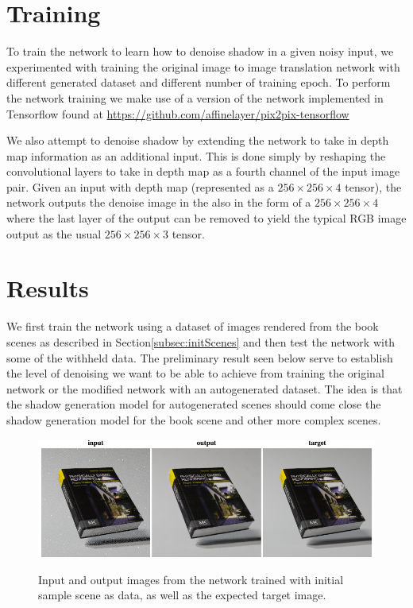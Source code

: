 \documentclass[acmsmall]{acmart}
\begin{document}
\section{Training}
\label{sec:train}

To train the network to learn how to denoise shadow in a given noisy input, we experimented with training the original image to image translation network with different generated dataset and different number of training epoch. %
To perform the network training we make use of a version of the network implemented in Tensorflow found at \url{https://github.com/affinelayer/pix2pix-tensorflow}

We also attempt to denoise shadow by extending the network to take in depth map information as an additional input. This is done simply by reshaping the convolutional layers to take in depth map as a fourth channel of the input image pair.  Given an input with depth map (represented as a $256\times256\times4$ tensor), the network outputs the denoise image in the also in the form of a $256\times256\times4$ where the last layer of the output can be removed to yield the typical RGB image output as the usual $256\times256\times3$ tensor.


\section{Results}
\label{sec:results}

We first train the network using a dataset of images rendered from the book scenes as described in Section\ref{subsec:initScenes} and then test the network with some of the withheld data. The preliminary result seen below serve to establish the level of denoising we want to be able to achieve from training the original network or the modified network with an autogenerated dataset. The idea is that the shadow generation model for autogenerated scenes should come close the shadow generation model for the book scene and other more complex scenes.

\begin{figure}[ht!]
	\includegraphics[width=\textwidth]{images/preliminary.png}
	\label{f:prelim}
	\caption{Input and output images from the network trained with initial sample scene as data, as well as the expected target image.}
\end{figure}
\end{document}
